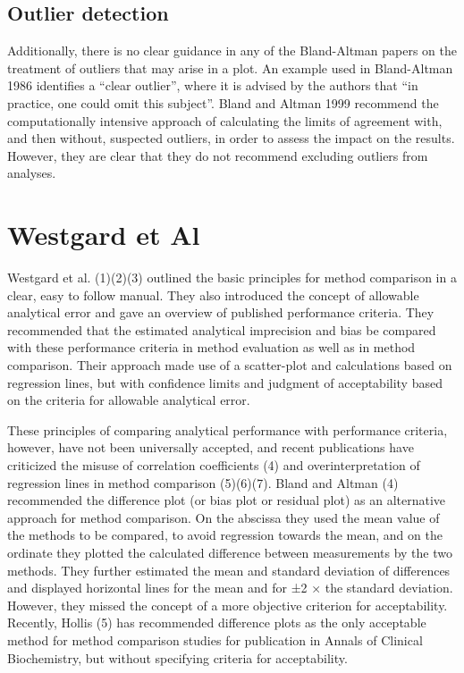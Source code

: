 \documentclass[12pt, a4paper]{report}
\theoremstyle{plain}
\theoremstyle{definition}
\theoremstyle{remark}
\begin{document}
\subsection{Outlier detection}
Additionally, there is no clear guidance in any of the Bland-Altman papers on the treatment of outliers that may arise in a plot.
An example used in Bland-Altman 1986 identifies a “clear outlier”, where it is advised by the authors that “in practice, one could omit this subject”.
Bland and Altman 1999 recommend the computationally intensive approach of calculating the limits of agreement with, and then without, suspected outliers, in order to assess the impact on the results. However, they are clear that they do not recommend excluding outliers from analyses.

\section{Westgard et Al}
Westgard et al. (1)(2)(3) outlined the basic principles for method comparison in a clear, easy to follow manual. They also introduced the concept of allowable analytical error and gave an overview of published performance criteria. They recommended that the estimated analytical imprecision and bias be compared with these performance criteria in method evaluation as well as in method comparison. Their approach made use of a scatter-plot and calculations based on regression lines, but with confidence limits and judgment of acceptability based on the criteria for allowable analytical error.

These principles of comparing analytical performance with performance criteria, however, have not been universally accepted, and recent publications have criticized the misuse of correlation coefficients (4) and overinterpretation of regression lines in method comparison (5)(6)(7). Bland and Altman (4) recommended the difference plot (or bias plot or residual plot) as an alternative approach for method comparison. On the abscissa they used the mean value of the methods to be compared, to avoid regression towards the mean, and on the ordinate they plotted the calculated difference between measurements by the two methods. They further estimated the mean and standard deviation of differences and displayed horizontal lines for the mean and for ±2 × the standard deviation. However, they missed the concept of a more objective criterion for acceptability. Recently, Hollis (5) has recommended difference plots as the only acceptable method for method comparison studies for publication in Annals of Clinical Biochemistry, but without specifying criteria for acceptability.
\end{document}
